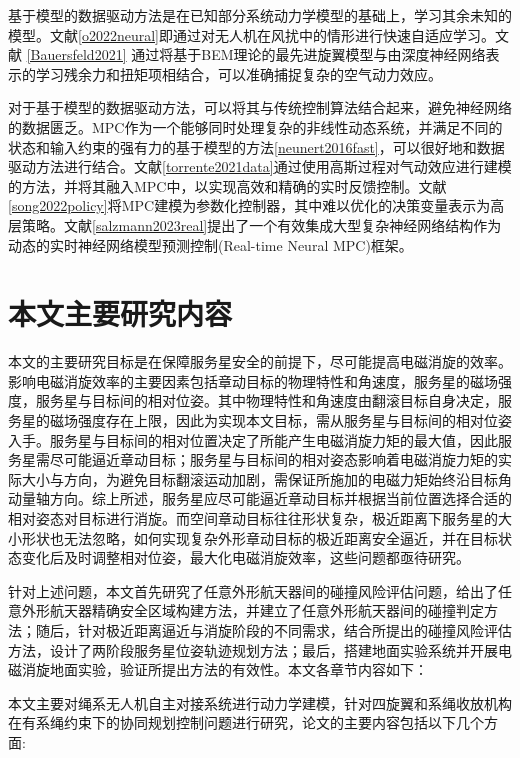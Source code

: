 \documentclass[lang=chs, degree=master, blindreview=false, winfonts=true]{yanputhesis}
\begin{document}
基于模型的数据驱动方法是在已知部分系统动力学模型的基础上，学习其余未知的模型。文献\ref{o2022neural}即通过对无人机在风扰中的情形进行快速自适应学习。文献 \ref{Bauersfeld2021} 通过将基于BEM理论的最先进旋翼模型与由深度神经网络表示的学习残余力和扭矩项相结合，可以准确捕捉复杂的空气动力效应。

对于基于模型的数据驱动方法，可以将其与传统控制算法结合起来，避免神经网络的数据匮乏。MPC作为一个能够同时处理复杂的非线性动态系统，并满足不同的状态和输入约束的强有力的基于模型的方法\ref{neunert2016fast}，可以很好地和数据驱动方法进行结合。文献\ref{torrente2021data}通过使用高斯过程对气动效应进行建模的方法，并将其融入MPC中，以实现高效和精确的实时反馈控制。文献\ref{song2022policy}将MPC建模为参数化控制器，其中难以优化的决策变量表示为高层策略。文献\ref{salzmann2023real}提出了一个有效集成大型复杂神经网络结构作为动态的实时神经网络模型预测控制(Real-time Neural MPC)框架。

\section{本文主要研究内容}

本文的主要研究目标是在保障服务星安全的前提下，尽可能提高电磁消旋的效率。影响电磁消旋效率的主要因素包括章动目标的物理特性和角速度，服务星的磁场强度，服务星与目标间的相对位姿。其中物理特性和角速度由翻滚目标自身决定，服务星的磁场强度存在上限，因此为实现本文目标，需从服务星与目标间的相对位姿入手。服务星与目标间的相对位置决定了所能产生电磁消旋力矩的最大值，因此服务星需尽可能逼近章动目标；服务星与目标间的相对姿态影响着电磁消旋力矩的实际大小与方向，为避免目标翻滚运动加剧，需保证所施加的电磁力矩始终沿目标角动量轴方向。综上所述，服务星应尽可能逼近章动目标并根据当前位置选择合适的相对姿态对目标进行消旋。而空间章动目标往往形状复杂，极近距离下服务星的大小形状也无法忽略，如何实现复杂外形章动目标的极近距离安全逼近，并在目标状态变化后及时调整相对位姿，最大化电磁消旋效率，这些问题都亟待研究。

针对上述问题，本文首先研究了任意外形航天器间的碰撞风险评估问题，给出了任意外形航天器精确安全区域构建方法，并建立了任意外形航天器间的碰撞判定方法；随后，针对极近距离逼近与消旋阶段的不同需求，结合所提出的碰撞风险评估方法，设计了两阶段服务星位姿轨迹规划方法；最后，搭建地面实验系统并开展电磁消旋地面实验，验证所提出方法的有效性。本文各章节内容如下：

本文主要对绳系无人机自主对接系统进行动力学建模，针对四旋翼和系绳收放机构 在有系绳约束下的协同规划控制问题进行研究，论文的主要内容包括以下几个方面:
\end{document}
